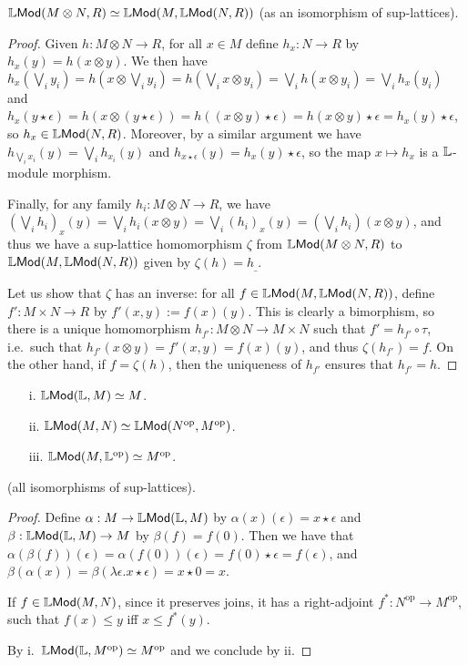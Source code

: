 \begin{proposition}
$\mathbb{L}\mathsf{Mod}(M\otimes N, R)   \simeq   \mathbb{L}\mathsf{Mod}(M, \mathbb{L}\mathsf{Mod}(N,R))$ (as an isomorphism of sup-lattices).
\end{proposition}
\begin{proof}
Given $h:M\otimes N\to R$, for all $x\in M$ define $h_{x}:N\to R$ by 
$h_{x}(y)=h(x\otimes y)$. We then have 
$h_{x}(\bigvee_{i}y_{i})=h(x\otimes \bigvee_{i}y_{i})=
h(\bigvee_{i}x\otimes  y_{i})=
\bigvee_{i}h(x\otimes  y_{i})=\bigvee_{i}h_{x}(y_{i})$ and 
$h_{x}(y\star\epsilon)= h(x\otimes (y\star \epsilon))=h((x\otimes y)\star\epsilon)=h(x\otimes y)\star \epsilon= h_{x}(y)\star\epsilon$, so $h_{x}\in \mathbb{L}\mathsf{Mod}(N,R)$. Moreover, by a similar argument we have  $h_{\bigvee_{i}x_{i}}(y)=\bigvee_{i}h_{x_{i}}(y)$
and $h_{x\star\epsilon}(y)=h_{x}(y)\star\epsilon$, so the map $x\mapsto h_{x}$ is a $\mathbb{L}$-module morphism. 

Finally, for any family $h_{i}:M\otimes N\to R$, we have 
$(\bigvee_{i}h_{i})_{x}(y)=\bigvee_{i}h_{i}(x\otimes y)=\bigvee_{i}(h_{i})_{x}(y)=(\bigvee_{i}h_{i})(x\otimes y)$, and thus we have a sup-lattice homomorphism $\zeta$ from $\mathbb{L}\mathsf{Mod}(M\otimes N,R)$ to $\mathbb{L}\mathsf{Mod}(M,\mathbb{L}\mathsf{Mod}(N,R))$ given by $\zeta(h)=h_{\_}$.

Let us show that $\zeta$ has an inverse:  for all $f\in \mathbb{L}\mathsf{Mod}(M,\mathbb{L}\mathsf{Mod}(N,R))$, define $f': M\times N\to R$ by $f'(x,y):=f(x)(y)$. This is clearly a bimorphism, so there is a unique homomorphism $h_{f'}:M\otimes N\to M\times N$ such that $f'=h_{f'}\circ \tau$, i.e.~such that 
$h_{f'}(x\otimes y)=f'(x,y)=f(x)(y)$, and thus $\zeta(h_{f'})=f$.
On the other hand, if $f=\zeta(h)$, then the uniqueness of $h_{f'}$ ensures that $h_{f'}=h$.
\end{proof}





\begin{proposition}
\begin{itemize}
\item[i.] $\mathbb{L}\mathsf{Mod}(\mathbb{L},M)\simeq M$.
\item[ii.] $\mathbb{L}\mathsf{Mod}(M,N)\simeq \mathbb{L}\mathsf{Mod}(N^{\mathrm{op}},M^{\mathrm{op}})$.
\item[iii.] $\mathbb{L}\mathsf{Mod}(M, \mathbb{L}^{\mathrm{op}})\simeq M^{\mathrm{op}}$.
\end{itemize}
(all isomorphisms of sup-lattices).
\end{proposition}
\begin{proof}
Define $\alpha:M\to \mathbb{L}\mathsf{Mod}(\mathbb{L},M)$ by $\alpha(x)(\epsilon)=x\star\epsilon$ and 
$\beta:\mathbb{L}\mathsf{Mod}(\mathbb{L},M)\to M$ by $\beta(f)=f(0)$. Then we have that 
$\alpha(\beta(f))(\epsilon)=\alpha(f(0))(\epsilon)=f(0)\star\epsilon=f(\epsilon)$, and 
$\beta(\alpha(x))=\beta(\lambda \epsilon.x\star\epsilon)=x\star0=x$.

If $f\in \mathbb{L}\mathsf{Mod}(M,N)$, since it preserves joins, it has a right-adjoint $f^{*}:N^{\mathrm{op}}\to M^{\mathrm{op}}$, such that $f(x)\leq y$ iff $x\leq f^{*}(y)$. 


By i.~$\mathbb{L}\mathsf{Mod}(\mathbb{L},M^{\mathrm{op}})\simeq M^{\mathrm{op}}$ and we conclude by ii.
\end{proof}

